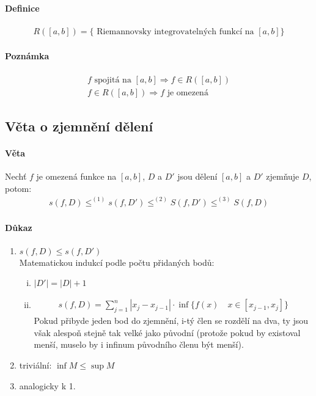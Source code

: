 \documentclass[a4paper,10pt]{article}
\begin{document}
\paragraph{Definice}
\begin{align*}
	R([a,b]) = \{ \text{ Riemannovsky integrovatelných funkcí na } [a,b]\}
\end{align*}

\paragraph{Poznámka}
\setcounter{equation}{0}
\begin{align}
	f \text{ spojitá na } [a,b] \Rightarrow f \in R([a,b]) \\
	f \in R([a,b]) \Rightarrow f \text{ je omezená }
\end{align}

\subsection{Věta o zjemnění dělení}
\setcounter{equation}{0}
\paragraph{Věta}
Nechť $f$ je omezená funkce na $[a,b]$, $D$ a $D'$ jsou dělení $[a,b]$ a $D'$
zjemňuje $D$, potom:
\begin{align*}
	s(f,D) \le^{(1)} s(f,D') \le^{(2)} S(f,D') \le^{(3)} S(f,D)
\end{align*}
\setcounter{equation}{3}

\paragraph{Důkaz}
\begin{enumerate}
	\item  $s(f,D) \le s(f,D')$ \\ 
	Matematickou indukcí podle počtu přidaných bodů: 
	\begin{enumerate}[i.]
		\item  $|D'| = |D|+1$
		\item  
			\begin{align*}
				s(f, D) = \sum_{j=1}^n |x_j - x_{j-1}| \cdot \inf \{f(x) \quad 
				x \in [x_{j-1},	x_j]\}
			\end{align*}
			Pokud přibyde jeden bod do zjemnění, i-tý člen se rozdělí na dva, ty
			jsou však alespoň stejně tak velké jako původní (protože pokud by
			existoval menší, muselo by i infinum původního členu být menší).
	\end{enumerate}
	\item  triviální: $\inf M \le \sup M$
	\item  analogicky k 1.
\end{enumerate}
\end{document}

